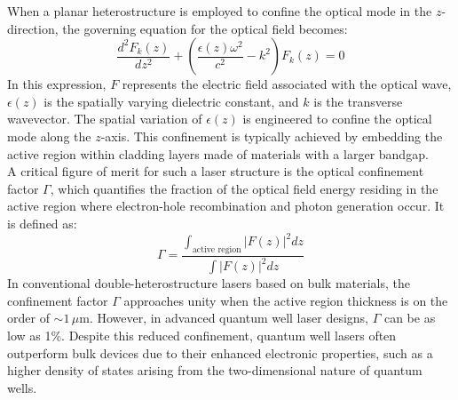 When a planar heterostructure is employed to confine the optical mode in the \( z \)-direction, the governing equation for the optical field becomes:
\begin{equation}
	\frac{d^2 F_k(z)}{dz^2} + \left( \frac{\epsilon(z) \omega^2}{c^2} - k^2 \right) F_k(z) = 0
\end{equation}
In this expression, \( F \) represents the electric field associated with the optical wave, \( \epsilon(z) \) is the spatially varying dielectric constant, and \( k \) is the transverse wavevector. The spatial variation of \( \epsilon(z) \) is engineered to confine the optical mode along the \( z \)-axis. This confinement is typically achieved by embedding the active region within cladding layers made of materials with a larger bandgap.\\
A critical figure of merit for such a laser structure is the optical confinement factor \( \Gamma \), which quantifies the fraction of the optical field energy residing in the active region where electron-hole recombination and photon generation occur. It is defined as:
\begin{equation}
	\Gamma = \frac{\int_{\text{active region}} |F(z)|^2 dz}{\int |F(z)|^2 dz}
\end{equation}
In conventional double-heterostructure lasers based on bulk materials, the confinement factor \( \Gamma \) approaches unity when the active region thickness is on the order of \( \sim 1 \, \mu\text{m} \). However, in advanced quantum well laser designs, \( \Gamma \) can be as low as 1\%. Despite this reduced confinement, quantum well lasers often outperform bulk devices due to their enhanced electronic properties, such as a higher density of states arising from the two-dimensional nature of quantum wells.
